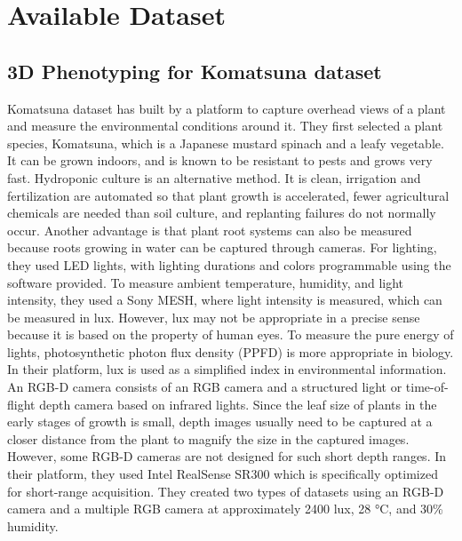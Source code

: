 \section{Available Dataset}

\subsection{3D Phenotyping for Komatsuna dataset}
Komatsuna dataset\cite{Uchiyama_2017_ICCV_Workshops} has built by a platform to capture overhead views of a plant and measure the environmental conditions around it. They first
selected a plant species, Komatsuna, which is a Japanese mustard spinach and a leafy vegetable. It can be grown indoors, and is known to
be resistant to pests and grows very fast. Hydroponic culture is an alternative method. It is clean, irrigation and fertilization are automated
so that plant growth is accelerated, fewer agricultural chemicals are needed than soil culture, and replanting failures do not normally occur.
Another advantage is that plant root systems can also be measured because roots growing in water can be captured through cameras. For lighting,
they used LED lights, with lighting durations and colors programmable using the software provided. To measure ambient temperature, humidity, and
light intensity, they used a Sony MESH, where light intensity is measured, which can be measured in lux. However, lux may not be appropriate in
a precise sense because it is based on the property of human eyes. To measure the pure energy of lights, photosynthetic photon flux density
(PPFD) is more appropriate in biology. In their platform, lux is used as a simplified index in environmental information. An RGB-D camera
consists of an RGB camera and a structured light or time-of-flight depth camera based on infrared lights. Since the leaf size of plants in the
early stages of growth is small, depth images usually need to be captured at a closer distance from the plant to magnify the size in the
captured images. However, some RGB-D cameras are not designed for such short depth ranges. In their platform, they used Intel RealSense SR300
which is specifically optimized for short-range acquisition.
They created two types of datasets using an RGB-D camera and a multiple RGB camera at approximately 2400 lux, 28 °C, and 30\% humidity.

